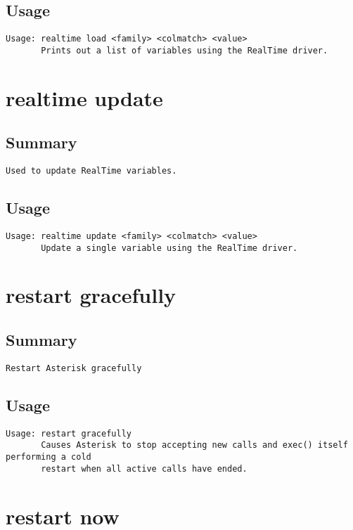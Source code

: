 \subsection{Usage}
\begin{verbatim}
Usage: realtime load <family> <colmatch> <value>
       Prints out a list of variables using the RealTime driver.

\end{verbatim}


\section{realtime update}
\subsection{Summary}
\begin{verbatim}
Used to update RealTime variables.
\end{verbatim}
\subsection{Usage}
\begin{verbatim}
Usage: realtime update <family> <colmatch> <value>
       Update a single variable using the RealTime driver.

\end{verbatim}


\section{restart gracefully}
\subsection{Summary}
\begin{verbatim}
Restart Asterisk gracefully
\end{verbatim}
\subsection{Usage}
\begin{verbatim}
Usage: restart gracefully
       Causes Asterisk to stop accepting new calls and exec() itself performing a cold
       restart when all active calls have ended.

\end{verbatim}


\section{restart now}
